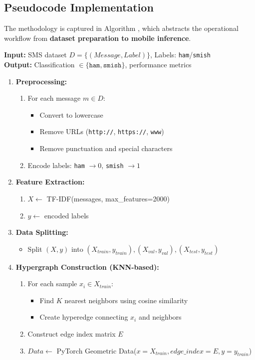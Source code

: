 \documentclass[conference]{IEEEtran}
\begin{document}
\subsection{ Pseudocode Implementation}  
The methodology is captured in Algorithm , which abstracts the operational workflow from \textbf{dataset preparation to mobile inference}.  



\textbf{Input:} SMS dataset $D = \{(Message, Label)\}$, Labels: \texttt{ham}/\texttt{smish} \\
\textbf{Output:} Classification $\in \{\texttt{ham}, \texttt{smish}\}$, performance metrics

\begin{enumerate}
    \item \textbf{Preprocessing:}
    \begin{enumerate}
        \item For each message $m \in D$:
        \begin{itemize}
            \item Convert to lowercase
            \item Remove URLs (\texttt{http://}, \texttt{https://}, \texttt{www})
            \item Remove punctuation and special characters
        \end{itemize}
        \item Encode labels: \texttt{ham} $\rightarrow 0$, \texttt{smish} $\rightarrow 1$
    \end{enumerate}
    
    \item \textbf{Feature Extraction:}
    \begin{enumerate}
        \item $X \gets$ TF-IDF(messages, max\_features=2000)
        \item $y \gets$ encoded labels
    \end{enumerate}
    
    \item \textbf{Data Splitting:}
    \begin{itemize}
        \item Split $(X, y)$ into $(X_{train}, y_{train}), (X_{val}, y_{val}), (X_{test}, y_{test})$
    \end{itemize}
    
    \item \textbf{Hypergraph Construction (KNN-based):}
    \begin{enumerate}
        \item For each sample $x_i \in X_{train}$:
        \begin{itemize}
            \item Find $K$ nearest neighbors using cosine similarity
            \item Create hyperedge connecting $x_i$ and neighbors
        \end{itemize}
        \item Construct edge index matrix $E$
        \item $Data \gets$ PyTorch Geometric Data($x = X_{train}, edge\_index = E, y = y_{train}$)
    \end{enumerate}
    

\end{enumerate}
\end{document}
